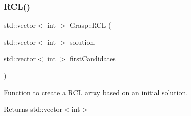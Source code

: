 \subsubsection{\texorpdfstring{R\+C\+L()}{RCL()}}
{\footnotesize\ttfamily std\+::vector$<$ int $>$ Grasp\+::\+R\+CL (\begin{DoxyParamCaption}\item[{std\+::vector$<$ int $>$}]{solution,  }\item[{std\+::vector$<$ int $>$}]{first\+Candidates }\end{DoxyParamCaption})}



Function to create a R\+CL array based on an initial solution. 

\begin{DoxyReturn}{Returns}
std\+::vector$<$int$>$ 
\end{DoxyReturn}

